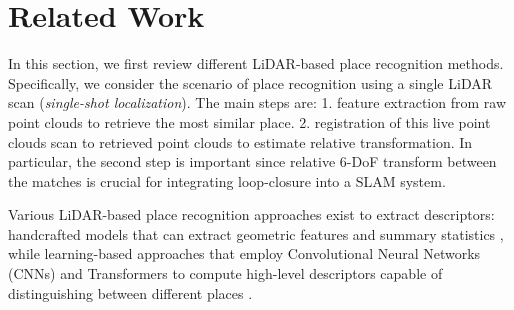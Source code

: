 \chapter{Related Work}
\label{sec:related}



In this section, we first review different LiDAR-based place recognition methods. Specifically, we consider the scenario of place recognition using a single LiDAR scan (\emph{single-shot localization}). The main steps are: 1. feature extraction from raw point clouds to retrieve the most similar place. 2. registration of this live point clouds scan to retrieved point clouds to estimate relative transformation. In particular, the second step is important since relative 6-DoF transform between the matches is crucial for integrating loop-closure into a SLAM system.  


Various LiDAR-based place recognition approaches exist to extract descriptors: handcrafted models that can extract geometric features and summary statistics \cite{kim2018iros, yuan2023icra}, while learning-based approaches that employ Convolutional Neural Networks (CNNs) and Transformers to compute high-level descriptors capable of distinguishing between different places \cite{vidanapathirana2022icra, komorowski2022ral}. 

